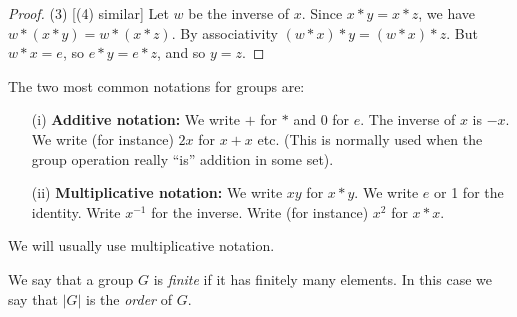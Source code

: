 \documentclass[10pt]{scrartcl}
\begin{document}
\begin{proof} (3) [(4) similar] Let $w$ be the inverse of $x$. Since $x*y = x*z$, we have $w*(x*y) = w*(x*z)$. By associativity $(w*x)*y = (w*x)*z$. But $w*x = e$, so $e*y = e*z$, and so $y = z$.
\end{proof} \vspace*{10pt}


The two most common notations for groups are:\begin{enumerate}
\item[(i)] \textbf{Additive notation:} We write $+$ for $*$ and 0 for $e$. The inverse of $x$ is $-x$. We write (for instance) $2x$ for $x+x$ etc. (This is normally used when the group operation really ``is'' addition in some set).
\item[(ii)] \textbf{Multiplicative notation:} We write $xy$ for $x*y$. We write $e$ or 1 for the identity. Write $x^{-1}$ for the inverse. Write (for instance) $x^2$ for $x*x$.
\end{enumerate}

We will usually use multiplicative notation.

We say that a group $G$ is \emph{finite} if it has finitely many elements. In this case we say that $|G|$ is the \emph{order} of $G$.\\
\end{document}
